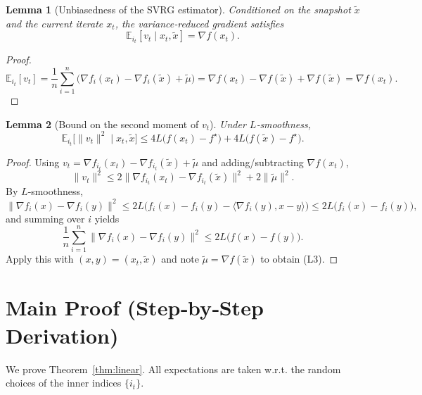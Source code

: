 \documentclass{article}
\newtheorem{lemma}{Lemma}
\newcommand{\E}{\mathbb{E}}
\begin{document}
\begin{lemma}[Unbiasedness of the SVRG estimator]\label{lem:unbiased}
Conditioned on the snapshot $\tilde{x}$ and the current iterate $x_t$, the variance‑reduced gradient satisfies
\[
\E_{i_t}[v_t\mid x_t,\tilde{x}]=\nabla f(x_t).
\tag{L2}
\]
\end{lemma}
\begin{proof}
\[
\E_{i_t}[v_t]=\frac{1}{n}\sum_{i=1}^{n}
\bigl(\nabla f_i(x_t)-\nabla f_i(\tilde{x})+\tilde{\mu}\bigr)
= \nabla f(x_t)-\nabla f(\tilde{x})+\nabla f(\tilde{x})
= \nabla f(x_t).
\] \qedhere
\end{proof}

\begin{lemma}[Bound on the second moment of $v_t$]\label{lem:variance}
Under $L$‑smoothness,
\[
\E_{i_t}\bigl[\|v_t\|^{2}\mid x_t,\tilde{x}\bigr]
\le 4L\bigl(f(x_t)-f^{\star}\bigr)+4L\bigl(f(\tilde{x})-f^{\star}\bigr).
\tag{L3}
\]
\end{lemma}
\begin{proof}
Using $v_t=\nabla f_{i_t}(x_t)-\nabla f_{i_t}(\tilde{x})+\tilde{\mu}$ and adding/subtracting $\nabla f(x_t)$,
\[
\|v_t\|^{2}\le 2\|\nabla f_{i_t}(x_t)-\nabla f_{i_t}(\tilde{x})\|^{2}
            +2\|\tilde{\mu}\|^{2}.
\]
By $L$‑smoothness,
\[
\|\nabla f_{i}(x)-\nabla f_{i}(y)\|^{2}\le 2L\bigl(f_i(x)-f_i(y)-\langle\nabla f_i(y),x-y\rangle\bigr)
\le 2L\bigl(f_i(x)-f_i(y)\bigr),
\]
and summing over $i$ yields
\[
\frac{1}{n}\sum_{i=1}^{n}\|\nabla f_i(x)-\nabla f_i(y)\|^{2}\le 2L\bigl(f(x)-f(y)\bigr).
\]
Apply this with $(x,y)=(x_t,\tilde{x})$ and note $\tilde{\mu}=\nabla f(\tilde{x})$ to obtain (L3). \qedhere
\end{proof}

\section*{Main Proof (Step‑by‑Step Derivation)}
We prove Theorem~\ref{thm:linear}. All expectations are taken w.r.t. the random choices of the inner indices $\{i_t\}$.
\end{document}
